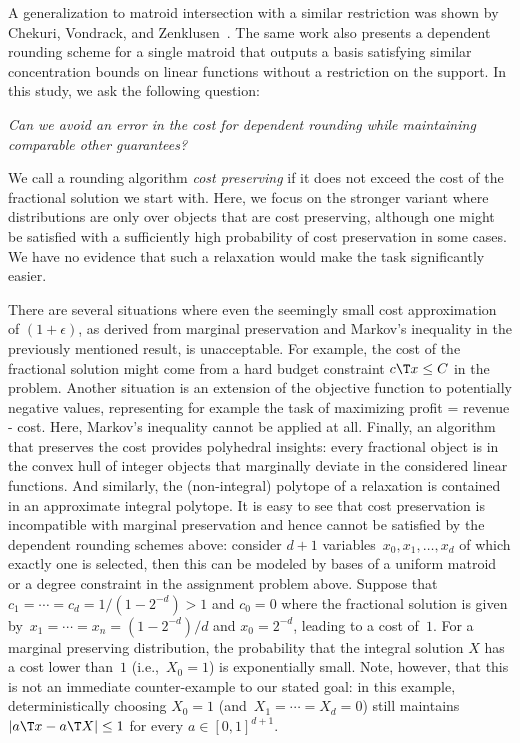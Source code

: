 \documentclass[a4paper,USenglish,cleveref,thm-restate]{lipics-v2021}
\begin{document}
A generalization to matroid intersection with a similar
restriction was shown by Chekuri, Vondrack, and Zenklusen~\cite{ChekuriVZ10}.
The same work also presents a dependent rounding
scheme for a single matroid that outputs a basis
satisfying similar concentration bounds on linear functions without a restriction on the support.
In this study, we ask the following question:
\begin{center}
    \medskip
    \emph{Can we avoid an error in the cost for dependent rounding while maintaining comparable other guarantees?}
    \medskip
\end{center}
We call a rounding algorithm \emph{cost preserving} if it does not
exceed the cost of the fractional solution we start with.
Here, we focus on the stronger variant where distributions are only over objects that are cost preserving, although one might be satisfied with a sufficiently high probability of cost preservation in some
cases. We have no evidence that such a relaxation would make the task significantly easier.

There are several situations where even the seemingly
small cost approximation of $(1 + \epsilon)$, as derived from
marginal preservation and Markov's inequality in the previously mentioned result, is unacceptable. For example, the cost of the fractional solution might come from a hard budget constraint $c\T x \le C$ in the problem.
Another situation is an extension of the objective function to
potentially negative values, representing for example the task of
maximizing profit = revenue - cost. Here, Markov's inequality
cannot be applied at all. Finally, an algorithm that preserves the cost
provides polyhedral insights: every fractional object
is in the convex hull of integer objects that marginally deviate
 in the considered linear functions. And similarly, the (non-integral) polytope of a relaxation is
contained in an approximate integral polytope. 
It is easy to see that cost preservation is incompatible with marginal preservation and hence cannot be satisfied by the dependent rounding schemes above: consider $d+1$ variables~$x_0, x_1, \dotsc, x_d$
of which exactly one is selected, then this can be modeled by bases of a uniform matroid or a degree constraint in the assignment problem above.
Suppose that $c_1 = \cdots = c_{d} = 1/(1 - 2^{-d}) > 1$ and $c_0 = 0$ where the fractional solution is given by~$x_1 = \cdots = x_n = (1 - 2^{-d})/d$
and $x_0 = 2^{-d}$, leading to a cost of~$1$. For a marginal preserving distribution, the probability that the integral solution $X$ has a cost lower than~$1$ (i.e.,~$X_0 = 1$) is exponentially small.
Note, however, that this is not an immediate counter-example to our stated goal:
in this example, deterministically choosing $X_0 = 1$ (and~$X_1 = \cdots = X_d = 0$) still maintains
$|a\T x - a\T X| \le 1$ for every $a\in [0, 1]^{d+1}$. 
\end{document}
